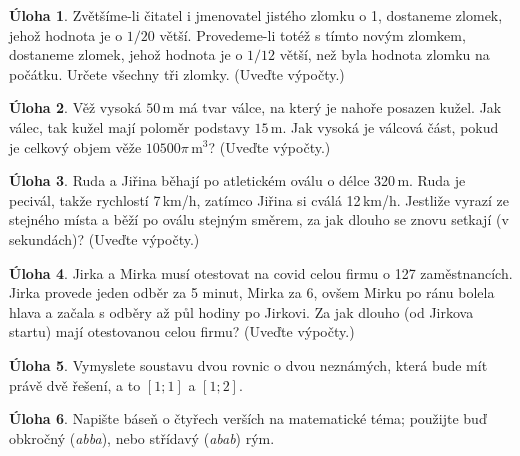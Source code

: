 \documentclass[11pt,a4paper]{article}
\theoremstyle{definition}
\newtheorem{uloha}{Úloha}
\begin{document}
\begin{uloha}
Zvětšíme-li čitatel i jmenovatel jistého zlomku o 1, dostaneme zlomek, jehož hodnota je o $1/20$ větší. Provedeme-li totéž s tímto novým zlomkem, dostaneme zlomek, jehož hodnota je o $1/12$ větší, než byla hodnota zlomku na počátku. Určete všechny tři zlomky. (Uveďte výpočty.)
\end{uloha}

\begin{uloha}
Věž vysoká $50$\,m má tvar válce, na který je nahoře posazen kužel. Jak válec, tak kužel mají poloměr podstavy $15$\,m. Jak vysoká je válcová část, pokud je celkový objem věže $10500\pi\,\mathrm{m}^3$?  (Uveďte výpočty.)
\end{uloha}

\begin{uloha}
Ruda a Jiřina běhají po atletickém oválu o délce 320\,m. Ruda je pecivál, takže  rychlostí 7\,km/h, zatímco Jiřina si cválá 12\,km/h. Jestliže vyrazí ze stejného místa a běží po oválu stejným směrem, za jak dlouho se znovu setkají (v sekundách)? (Uveďte výpočty.)
\end{uloha}

\begin{uloha}
Jirka a Mirka musí otestovat na covid celou firmu o 127 zaměstnancích. Jirka provede jeden odběr za 5 minut, Mirka za 6, ovšem Mirku po ránu bolela hlava a začala s odběry až půl hodiny po Jirkovi. Za jak dlouho (od Jirkova startu) mají otestovanou celou firmu? (Uveďte výpočty.)
\end{uloha}

\begin{uloha}
Vymyslete soustavu dvou rovnic o dvou neznámých, která bude mít právě dvě řešení, a to $[1; 1]$ a $[1; 2]$.
\end{uloha}

\begin{uloha}
Napište báseň o čtyřech verších na matematické téma; použijte buď obkročný (\emph{abba}), nebo střídavý (\emph{abab}) rým.
\end{uloha}
\end{document}
